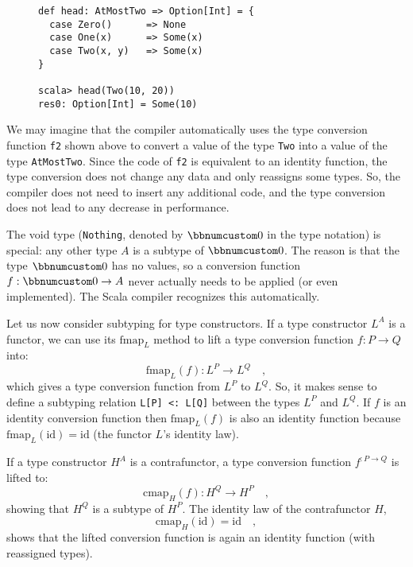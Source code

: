 \begin{wrapfigure}{l}{0.4\columnwidth}%
\vspace{-0.5\baselineskip}
\begin{lstlisting}
def head: AtMostTwo => Option[Int] = {
  case Zero()      => None
  case One(x)      => Some(x)
  case Two(x, y)   => Some(x)
}

scala> head(Two(10, 20))
res0: Option[Int] = Some(10)
\end{lstlisting}

\vspace{-1\baselineskip}
\end{wrapfigure}%
We may imagine that the compiler automatically uses the type conversion
function \lstinline!f2! shown above to convert a value of the type
\lstinline!Two! into a value of the type \lstinline!AtMostTwo!.
Since the code of \lstinline!f2! is equivalent to an identity function,
the type conversion does not change any data and only reassigns some
types. So, the compiler does not need to insert any additional code,
and the type conversion does not lead to any decrease in performance.

The void type (\lstinline!Nothing!, denoted by $\bbnum 0$ in the
type notation) is special: any other type $A$ is
a subtype of $\bbnum 0$. The reason is that the type $\bbnum 0$
has no values, so a conversion function $f:\bbnum 0\rightarrow A$
never actually needs to be applied (or even implemented). The Scala
compiler recognizes this automatically.

Let us now consider subtyping for type constructors. If a type constructor
$L^{A}$ is a functor, we can use its $\text{fmap}_{L}$ method to
lift a type conversion function $f:P\rightarrow Q$ into:
\[
\text{fmap}_{L}(f):L^{P}\rightarrow L^{Q}\quad,
\]
which gives a type conversion function from $L^{P}$ to $L^{Q}$.
So, it makes sense to define a subtyping relation \lstinline!L[P] <: L[Q]!
between the types $L^{P}$ and $L^{Q}$. If $f$ is an identity conversion
function then $\text{fmap}_{L}(f)$ is also an identity function because
$\text{fmap}_{L}(\text{id})=\text{id}$ (the functor $L$\textsf{'}s identity
law).

If a type constructor $H^{A}$ is a contrafunctor, a type conversion
function $f^{:P\rightarrow Q}$ is lifted to:
\[
\text{cmap}_{H}(f):H^{Q}\rightarrow H^{P}\quad,
\]
showing that $H^{Q}$ is a subtype of $H^{P}$. The identity law of
the contrafunctor $H$,
\[
\text{cmap}_{H}(\text{id})=\text{id}\quad,
\]
shows that the lifted conversion function is again an identity function
(with reassigned types).

